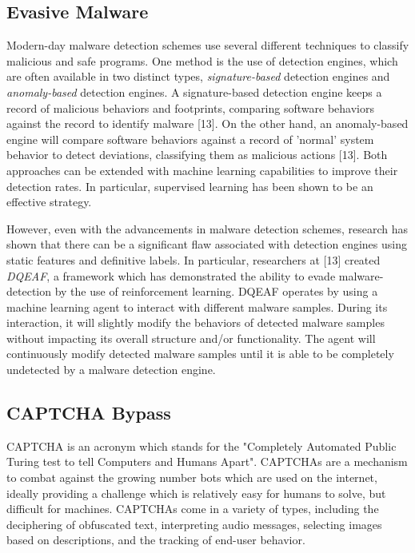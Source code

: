 \documentclass[11pt,conference]{IEEEtran}
\begin{document}
\subsection{Evasive Malware}
Modern-day malware detection schemes use several different techniques to
classify malicious and safe programs. One method is the use of detection
engines, which are often available in two distinct types,
\emph{signature-based} detection engines and \emph{anomaly-based} detection
engines. A signature-based detection engine keeps a record of malicious
behaviors and footprints, comparing software behaviors against the record to
identify malware [13]. On the other hand, an anomaly-based engine will
compare software behaviors against a record of 'normal' system behavior to
detect deviations, classifying them as malicious actions [13]. Both approaches can be extended with machine learning
capabilities to improve their detection rates. In particular, supervised
learning has been shown to be an effective strategy.

However, even with the advancements in malware detection schemes, research
has shown that there can be a significant flaw associated with detection
engines using static features and definitive labels. In particular, researchers
at [13] created \emph{DQEAF}, a framework which has demonstrated the ability to evade malware-detection by
the use of reinforcement learning. DQEAF operates by using a machine
learning agent to interact with different malware samples. During its
interaction, it will slightly modify the behaviors of detected malware samples
without impacting its overall structure and/or functionality. The agent will
continuously modify detected malware samples until it is able to be completely
undetected by a malware detection engine.

\subsection{CAPTCHA Bypass}
CAPTCHA is an acronym which stands for the "Completely Automated Public Turing test
to tell Computers and Humans Apart". CAPTCHAs are a 
mechanism to combat against the growing number bots which are used on the
internet, ideally providing a challenge which is relatively easy for humans to
solve, but difficult for machines. CAPTCHAs come in a variety of types,
including the deciphering of obfuscated text, interpreting audio messages,
selecting images based on descriptions, and the tracking of end-user behavior.
\end{document}
